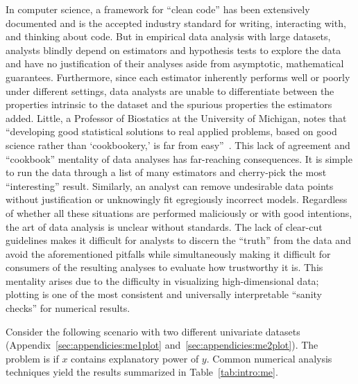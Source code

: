 In computer science, a framework for ``clean code'' has been extensively
documented and is the accepted industry standard for writing, interacting with,
and thinking about code. But in empirical data analysis with large datasets,
analysts blindly depend on estimators and hypothesis tests to explore the data
and have no justification of their analyses aside from asymptotic, mathematical
guarantees. Furthermore, since each estimator inherently performs well or poorly
under different settings, data analysts are unable to differentiate between the
properties intrinsic to the dataset and the spurious properties the estimators
added. Little, a Professor of Biostatics at the University of Michigan, notes
that ``developing good statistical solutions to real applied problems, based on
good science rather than `cookbookery,' is far from easy''~\cite{little2013}.
This lack of agreement and ``cookbook'' mentality of data analyses has
far-reaching consequences. It is simple to run the data through a list of many
estimators and cherry-pick the most ``interesting'' result. Similarly, an
analyst can remove undesirable data points without justification or unknowingly
fit egregiously incorrect models. Regardless of whether all these situations are
performed maliciously or with good intentions, the art of data analysis is
unclear without standards. The lack of clear-cut guidelines makes it difficult
for analysts to discern the ``truth'' from the data and avoid the aforementioned
pitfalls while simultaneously making it difficult for consumers of the resulting
analyses to evaluate how trustworthy it is. This mentality arises due to the
difficulty in visualizing high-dimensional data; plotting is one of the most
consistent and universally interpretable ``sanity checks'' for numerical
results.

Consider the following scenario with two different univariate datasets
(Appendix~\ref{sec:appendicies:me1plot} and~\ref{sec:appendicies:me2plot}). The
problem is if $x$ contains explanatory power of $y$. Common numerical analysis
techniques yield the results summarized in Table~\ref{tab:intro:me}.

\tablespacing

